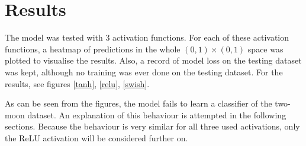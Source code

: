 \section{Results}

The model was tested with 3 activation functions. For each of these activation functions, a heatmap of predictions in the whole \( \left( 0, 1 \right) \times \left( 0, 1 \right) \) space was plotted to visualise the results. Also, a record of model loss on the testing dataset was kept, although no training was ever done on the testing dataset. For the results, see figures \ref{tanh}, \ref{relu}, \ref{swish}. 

As can be seen from the figures, the model fails to learn a classifier of the two-moon dataset. An explanation of this behaviour is attempted in the following sections. Because the behaviour is very similar for all three used activations, only the ReLU activation will be considered further on.

